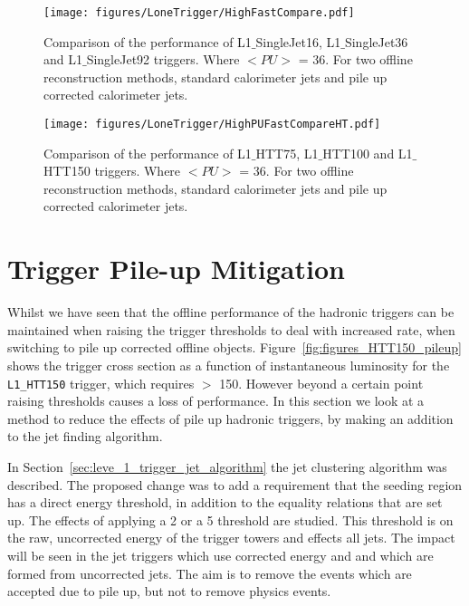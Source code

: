 \begin{figure}[htbp]
  \centering
    \texttt{[image: figures/LoneTrigger/HighFastCompare.pdf]}
  \caption{Comparison of the performance of L1$\_$SingleJet16, L1$\_$SingleJet36 and L1$\_$SingleJet92 triggers. Where $<PU>$ = 36. For two offline reconstruction methods, standard \AK calorimeter jets and pile up corrected \AK calorimeter jets.}
  \label{fig:figures_LoneTrigger_HighFastCompare}
\end{figure}

\begin{figure}[htbp]
  \centering
    \texttt{[image: figures/LoneTrigger/HighPUFastCompareHT.pdf]}
  \caption{Comparison of the performance of  L1$\_$HTT75, L1$\_$HTT100 and  L1$\_$HTT150 triggers. Where $<PU>$ = 36. For two offline reconstruction methods, standard \AK calorimeter jets and pile up corrected \AK calorimeter jets.}
  \label{fig:figures_LoneTrigger_HighPUFastCompareHT}
\end{figure}

\clearpage
\section{\Lone Trigger Pile-up Mitigation} %
\label{sub:lone_trigger_pile_up_mitigation}


Whilst we have seen that the offline performance of the \Lone hadronic triggers 
can be maintained when raising the trigger thresholds to deal with increased 
rate, when switching to pile up corrected offline objects. 
Figure~\ref{fig:figures_HTT150_pileup} shows the trigger cross section as a 
function of instantaneous luminosity for the \verb|L1_HTT150| trigger, which 
requires \HT $>$ \unit{150}{\GeV}. However beyond a certain point raising 
thresholds causes a loss of performance.
In this section we look at a method to reduce the effects of pile up hadronic 
\Lone triggers, by making an addition to the \Lone jet finding algorithm.

In Section~\ref{sec:leve_1_trigger_jet_algorithm} the \Lone jet clustering 
algorithm was described. The proposed change was to add a requirement that the 
seeding region has a direct energy threshold, in addition to the equality 
relations that are set up. The effects of applying a \unit{2}{\GeV} or a 
\unit{5}{\GeV} threshold are studied. This threshold is on the raw, uncorrected 
energy of the trigger towers and effects all \Lone jets. The impact will be 
seen in the \Lone jet triggers which use corrected energy and \Lone \HT and 
\HTm which are formed from uncorrected jets.
The aim is to remove the events which are accepted due to pile up, but not to 
remove physics events.

